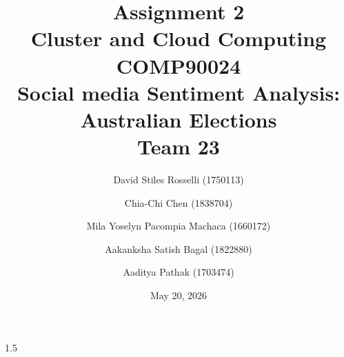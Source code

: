 \documentclass[11pt, letterpaper]{article}
\author{
	David Stiles Rosselli (1750113)
	\and Chia-Chi Chen (1838704)
	\and Mila Yoselyn Pacompia Machaca (1660172)
	\and Aakanksha Satish Bagal (1822880)
	\and Aaditya Pathak (1703474)
}
\title{Assignment 2 \\Cluster and Cloud Computing COMP90024 \\ Social media Sentiment Analysis: 
Australian Elections \\
Team 23
}
\date{May 20, 2026}
\begin{document}
\maketitle


\begin{spacing}{1.5} 
    
\end{spacing}


\clearpage 

\tableofcontents

\clearpage







	
	
	
	\newpage
	
	
	
\end{document}
